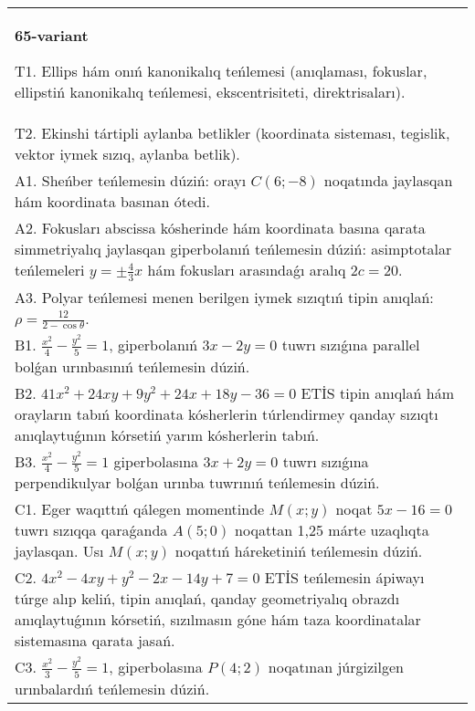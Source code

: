 \documentclass{article}
\begin{document}
\begin{tabular}{m{17cm}}
\textbf{65-variant}
\newline

T1. Ellips hám onıń kanonikalıq teńlemesi (anıqlaması, fokuslar, ellipstiń kanonikalıq teńlemesi, ekscentrisiteti, direktrisaları).\\

T2. Ekinshi tártipli aylanba betlikler (koordinata sisteması, tegislik, vektor iymek sızıq, aylanba betlik).\\

A1. Sheńber teńlemesin dúziń: orayı $C (6 ;-8) $ noqatında jaylasqan hám koordinata basınan ótedi.\\

A2. Fokusları abscissa kósherinde hám koordinata basına qarata simmetriyalıq jaylasqan giperbolanıń teńlemesin dúziń: asimptotalar teńlemeleri $y=\pm \frac{4}{3}x$ hám fokusları arasındaǵı aralıq $2 c=20$.\\

A3. Polyar teńlemesi menen berilgen iymek sızıqtıń tipin anıqlań: $\rho=\frac{12}{2-\cos\theta}$.\\

B1. $\frac{x^{2}}{4} - \frac{y^{2}}{5} = 1$, giperbolanıń $3x - 2y = 0$ tuwrı sızıǵına parallel bolǵan urınbasınıń teńlemesin dúziń.  \\

B2. $41x^{2} + 24xy + 9y^{2} + 24x + 18y - 36 = 0$ ETİS tipin anıqlań hám orayların tabıń koordinata kósherlerin túrlendirmey qanday sızıqtı anıqlaytuǵının kórsetiń yarım kósherlerin tabıń.  \\

B3. $\frac{x^{2}}{4} - \frac{y^{2}}{5} = 1$ giperbolasına $3x + 2y = 0$ tuwrı sızıǵına perpendikulyar bolǵan urınba tuwrınıń teńlemesin dúziń.\\

C1. Eger waqıttıń qálegen momentinde $M(x;y)$ noqat $5x - 16 = 0$ tuwrı sızıqqa qaraǵanda $A(5;0)$ noqattan 1,25 márte uzaqlıqta jaylasqan. Usı $M(x;y)$ noqattıń háreketiniń teńlemesin dúziń.  \\

C2. $4x^{2} - 4xy + y^{2} - 2x - 14y + 7 = 0$ ETİS teńlemesin ápiwayı túrge alıp keliń, tipin anıqlań, qanday geometriyalıq obrazdı anıqlaytuǵının kórsetiń, sızılmasın góne hám taza koordinatalar sistemasına qarata jasań.  \\

C3. $\frac{x^{2}}{3} - \frac{y^{2}}{5} = 1$, giperbolasına $P(4;2)$ noqatınan júrgizilgen urınbalardıń teńlemesin dúziń.  \\

\end{tabular}
\vspace{1cm}
\end{document}
